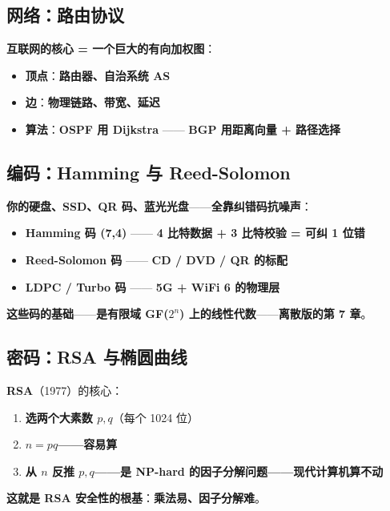 \subsection{网络：路由协议}

\textbf{互联网的核心 = 一个巨大的有向加权图}：

\begin{itemize}
\item \textbf{顶点}：\textbf{路由器、自治系统 AS}
\item \textbf{边}：\textbf{物理链路、带宽、延迟}
\item \textbf{算法}：\textbf{OSPF 用 Dijkstra} —— \textbf{BGP 用距离向量 + 路径选择}
\end{itemize}

\subsection{编码：Hamming 与 Reed-Solomon}

\textbf{你的硬盘、SSD、QR 码、蓝光光盘}——\textbf{全靠\textbf{纠错码}抗噪声}：

\begin{itemize}
\item \textbf{Hamming 码 (7,4)} —— \textbf{4 比特数据 + 3 比特校验 = 可纠 1 位错}
\item \textbf{Reed-Solomon 码} —— \textbf{CD / DVD / QR 的标配}
\item \textbf{LDPC / Turbo 码} —— \textbf{5G + WiFi 6 的物理层}
\end{itemize}

\textbf{这些码的基础}——\textbf{是\textbf{有限域 GF($2^n$) 上的线性代数}}——\textbf{离散版的第 7 章}。

\subsection{密码：RSA 与椭圆曲线}

\textbf{RSA}（1977）的核心：

\begin{enumerate}
\item \textbf{选两个大素数 $p, q$}（每个 1024 位）
\item \textbf{$n = pq$——容易算}
\item \textbf{从 $n$ 反推 $p, q$——\textbf{是 NP-hard 的因子分解问题}——\textbf{现代计算机算不动}}
\end{enumerate}

\textbf{这就是 RSA 安全性的根基}：\textbf{乘法易、因子分解难}。

